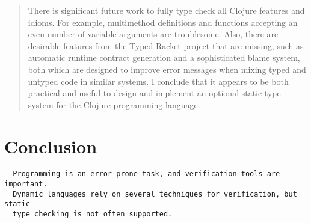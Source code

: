 \documentclass{cshonours}
\begin{document}
\begin{abstract}
There is significant future work to fully type check all Clojure features and idioms.
For example, multimethod definitions and functions accepting an even number of variable arguments
are troublesome. 
Also, there are desirable features from the Typed Racket project that are missing, such
as automatic runtime contract generation and a sophisticated blame system, 
both which are designed to improve error messages when mixing typed and untyped code in similar systems.
I conclude that it appears to be both practical and useful to design and implement an optional static type system for the
Clojure programming language.

\end{abstract}

\tableofcontents














%
%

%


\chapter{Conclusion}

\begin{verbatim}
  Programming is an error-prone task, and verification tools are important.
  Dynamic languages rely on several techniques for verification, but static
  type checking is not often supported.
\end{verbatim}

\printbibliography[title=References]
\end{document}
